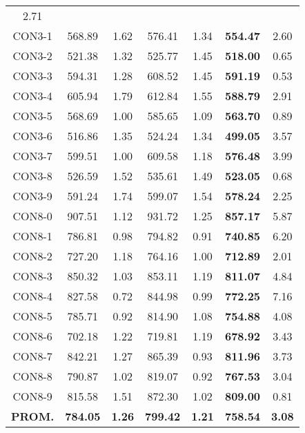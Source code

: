 \begin{table}[h]
\begin{tabular}{c c c c c c c}
2.71\\CON3-1 & 568.89 & 1.62 & 
576.41 & 1.34 & \bf{554.47} & 
2.60\\CON3-2 & 521.38 & 1.32 & 
525.77 & 1.45 & \bf{518.00} & 
0.65\\CON3-3 & 594.31 & 1.28 & 
608.52 & 1.45 & \bf{591.19} & 
0.53\\CON3-4 & 605.94 & 1.79 & 
612.84 & 1.55 & \bf{588.79} & 
2.91\\CON3-5 & 568.69 & 1.00 & 
585.65 & 1.09 & \bf{563.70} & 
0.89\\CON3-6 & 516.86 & 1.35 & 
524.24 & 1.34 & \bf{499.05} & 
3.57\\CON3-7 & 599.51 & 1.00 & 
609.58 & 1.18 & \bf{576.48} & 
3.99\\CON3-8 & 526.59 & 1.52 & 
535.61 & 1.49 & \bf{523.05} & 
0.68\\CON3-9 & 591.24 & 1.74 & 
599.07 & 1.54 & \bf{578.24} & 
2.25\\CON8-0 & 907.51 & 1.12 & 
931.72 & 1.25 & \bf{857.17} & 
5.87\\CON8-1 & 786.81 & 0.98 & 
794.82 & 0.91 & \bf{740.85} & 
6.20\\CON8-2 & 727.20 & 1.18 & 
764.16 & 1.00 & \bf{712.89} & 
2.01\\CON8-3 & 850.32 & 1.03 & 
853.11 & 1.19 & \bf{811.07} & 
4.84\\CON8-4 & 827.58 & 0.72 & 
844.98 & 0.99 & \bf{772.25} & 
7.16\\CON8-5 & 785.71 & 0.92 & 
814.90 & 1.08 & \bf{754.88} & 
4.08\\CON8-6 & 702.18 & 1.22 & 
719.81 & 1.19 & \bf{678.92} & 
3.43\\CON8-7 & 842.21 & 1.27 & 
865.39 & 0.93 & \bf{811.96} & 
3.73\\CON8-8 & 790.87 & 1.02 & 
819.07 & 0.92 & \bf{767.53} & 
3.04\\CON8-9 & 815.58 & 1.51 & 
872.30 & 1.02 & \bf{809.00} & 
0.81\\\bf{PROM.} & 
\bf{784.05} & \bf{1.26} & \bf{799.42} & \bf{1.21} & \bf{758.54} & \bf{3.08}\\[1ex]\hline
\end{tabular}
\label{table:ILS-VND-M-5-70}
\end{table}

